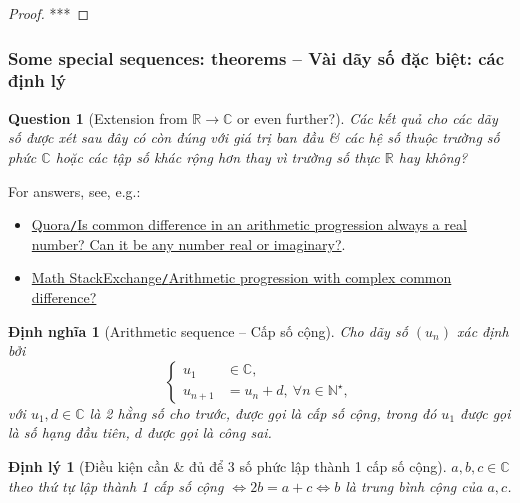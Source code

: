 \documentclass{article}
\newtheorem{dinhly}{Định lý}
\newtheorem{dinhnghia}{Định nghĩa}
\newtheorem{question}{Question}
\begin{document}
\begin{proof}
	***
\end{proof}



\subsubsection{Some special sequences: theorems -- Vài dãy số đặc biệt: các định lý}

\begin{question}[Extension from $\mathbb{R}\to\mathbb{C}$ or even further?]
	Các kết quả cho các dãy số được xét sau đây có còn đúng với giá trị ban đầu \& các hệ số thuộc trường số phức $\mathbb{C}$ hoặc các tập số khác rộng hơn thay vì trường số thực $\mathbb{R}$ hay không?
\end{question}
For answers, see, e.g.:
\begin{itemize}
	\item \href{https://www.quora.com/Is-common-difference-in-an-arithmetic-progression-always-a-real-number-Can-it-be-any-number-real-or-imaginary}{Quora{\tt/}Is common difference in an arithmetic progression always a real number? Can it be any number real or imaginary?}.
	\item \href{https://math.stackexchange.com/questions/1299820/arithmetic-progression-with-complex-common-difference}{Math StackExchange{\tt/}Arithmetic progression with complex common difference?}
\end{itemize}

\begin{dinhnghia}[Arithmetic sequence -- Cấp số cộng]
	Cho dãy số $(u_n)$ xác định bởi
	\begin{equation}
		\label{arithmetic sequence}
		\tag{csc}
		\left\{\begin{split}
			u_1&\in\mathbb{C},\\
			u_{n+1} &= u_n + d,\ \forall n\in\mathbb{N}^\star,
		\end{split}\right.
	\end{equation}
	với $u_1,d\in\mathbb{C}$ là 2 hằng số cho trước, được gọi là {\rm cấp số cộng}, trong đó $u_1$ được gọi là {\rm số hạng đầu tiên}, $d$ được gọi là {\rm công sai}.
\end{dinhnghia}

\begin{dinhly}[Điều kiện cần \& đủ để 3 số phức lập thành 1 cấp số cộng]
	$a,b,c\in\mathbb{C}$ theo thứ tự lập thành 1 cấp số cộng $\Leftrightarrow2b = a + c\Leftrightarrow b$ là trung bình cộng của $a,c$.
\end{dinhly}
\end{document}
